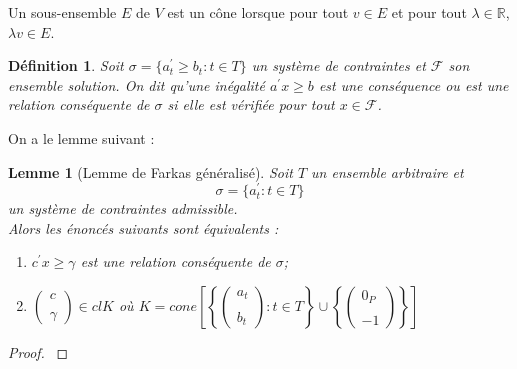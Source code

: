 \documentclass[11pt]{report}
\newenvironment{boxtheorem}
{\begin{tcolorbox}
		[enhanced jigsaw,breakable,pad at break*=2mm,
		colback=black!5,colframe=bleueLeger]}
	{\end{tcolorbox}}
\newenvironment{boxdefinition}
{\begin{tcolorbox}
		[enhanced jigsaw,breakable,pad at break*=1mm,
		colback=black!5!white,boxrule=0pt,frame hidden,
		borderline west={1.5mm}{-2mm}{blue}]}
	{\end{tcolorbox}}
\theoremstyle{styletheorem}
\newtheorem{lemma}[theoreme]{Lemme}
\theoremstyle{styledef}
\newtheorem{definitions}[theoreme]{Définition}
\theoremstyle{remark}
\newenvironment{lemme}
{\vspace*{0.3cm}\begin{boxtheorem}\begin{lemma}}{\end{lemma}\end{boxtheorem}\vspace*{0.3cm}}
\newenvironment{definition}{\vspace*{0.3cm}\begin{boxdefinition}\begin{definitions}}{\end{definitions}\end{boxdefinition}\vspace*{0.3cm}}
\newcommand{\R}{\ensuremath{\mathbb{R}}}
\begin{document}
Un sous-ensemble $E$ de $V$ est un cône lorsque pour tout $v \in E$ et pour tout $\lambda \in \R$, $\lambda v \in E$.
\begin{definition}
	Soit $\sigma = \lbrace a_t^\prime \geq b_t \colon t \in T \rbrace$ un système de contraintes et $\mathcal{F}$ son ensemble solution. On dit qu'une inégalité $a^\prime x \geq b$ est une conséquence ou est une relation conséquente de $\sigma$ si elle est vérifiée pour tout $x \in \mathcal{F}$. 
\end{definition}
On a le lemme suivant :
\begin{lemme}[Lemme de Farkas généralisé]
	Soit $T$ un ensemble arbitraire et $$\sigma = \lbrace a_t^\prime \colon t \in T \rbrace$$ un système de contraintes admissible.\\
	Alors les énoncés suivants sont équivalents :
	\begin{enumerate}[label = (\roman*)]
		\item $c^\prime x\geq \gamma$ est une relation conséquente de $\sigma$;	
		\item $\begin{pmatrix}
			c\\ \\ \gamma
		\end{pmatrix} \in cl K$ où $K = cone \left[ \left \lbrace \begin{pmatrix}
			a_t\\ \\ b_t
		\end{pmatrix} \colon t \in T \right\rbrace  \cup \left \lbrace  \begin{pmatrix}
			0_P \\ \\ -1
		\end{pmatrix}\right \rbrace \right]$
	\end{enumerate}
\end{lemme}
\begin{proof}
	\cite{b15}
\end{proof}
\end{document}

